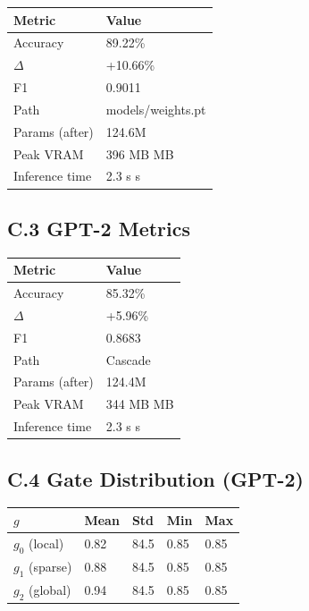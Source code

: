 \begin{table}[H]
\centering
\small
\begin{tabular}{ll}
\toprule
\textbf{Metric} & \textbf{Value} \\
\midrule
Accuracy & 89.22\% \\
$\Delta$ & +10.66\% \\
F1 & 0.9011 \\
Path & models/weights.pt \\
Params (after) & 124.6M \\
Peak VRAM & 396 MB MB \\
Inference time & 2.3 s s \\
\bottomrule
\end{tabular}
\end{table}

\subsection{C.3 GPT-2 Metrics}

\begin{table}[H]
\centering
\small
\begin{tabular}{ll}
\toprule
\textbf{Metric} & \textbf{Value} \\
\midrule
Accuracy & 85.32\% \\
$\Delta$ & +5.96\% \\
F1 & 0.8683 \\
Path & Cascade \\
Params (after) & 124.4M \\
Peak VRAM & 344 MB MB \\
Inference time & 2.3 s s \\
\bottomrule
\end{tabular}
\end{table}

\subsection{C.4 Gate Distribution (GPT-2)}

\begin{table}[H]
\centering
\small
\begin{tabular}{lllll}
\toprule
\textbf{$g$} & \textbf{Mean} & \textbf{Std} & \textbf{Min} & \textbf{Max} \\
\midrule
$g_0$ (local) & 0.82 & 84.5 & 0.85 & 0.85 \\
$g_1$ (sparse) & 0.88 & 84.5 & 0.85 & 0.85 \\
$g_2$ (global) & 0.94 & 84.5 & 0.85 & 0.85 \\
\bottomrule
\end{tabular}
\end{table}

